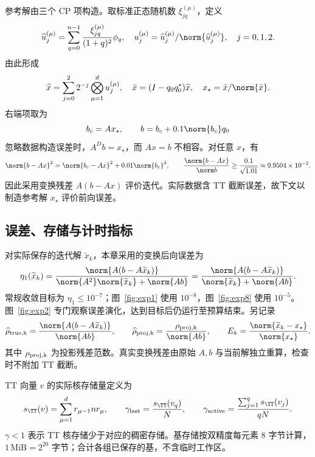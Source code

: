 参考解由三个 CP 项构造。取标准正态随机数 $\xi_{jq}^{(\mu)}$，定义
\[
 \widehat u_j^{(\mu)}=\sum_{q=0}^{n-1}\frac{\xi_{jq}^{(\mu)}}{(1+q)^2}\phi_q,
 \quad u_j^{(\mu)}=\widehat u_j^{(\mu)}/\norm{\widehat u_j^{(\mu)}},\quad j=0,1,2.
\]
由此形成
\begin{equation}\label{eq:exp-reference}
 \widehat x=\sum_{j=0}^2 2^{-j}\bigotimes_{\mu=1}^d u_j^{(\mu)},\quad
 \bar x=(I-q_0q_0^*)\widehat x,\quad x_\star=\bar x/\norm{\bar x}.
\end{equation}
右端项取为
\begin{equation}\label{eq:exp-rhs}
 b_c=Ax_\star,\qquad b=b_c+0.1\norm{b_c}q_0
\end{equation}
忽略数据构造误差时，$A^Db=x_\star$，而 $Ax=b$ 不相容。对任意 $x$，有
\[
 \norm{b-Ax}^2
 =\norm{b_c-Ax}^2+0.01\norm{b_c}^2,
 \qquad
 \frac{\norm{b-Ax}}{\norm b}\ge\frac{0.1}{\sqrt{1.01}}
 \approx9.9504\times10^{-2}.
\]
因此采用变换残差 $A(b-Ax)$ 评价迭代。实际数据含 TT 截断误差，故下文以制造参考解 $x_\star$ 评价前向误差。

\subsection{误差、存储与计时指标}

对实际保存的迭代解 $\widetilde x_k$，本章采用的变换后向误差为
\begin{equation}\label{eq:exp-eta}
 \eta_1(\widetilde x_k)
 =\frac{\norm{A(b-A\widetilde x_k)}}
 {\norm{A^2}\norm{\widetilde x_k}+\norm{Ab}}
 =\frac{\norm{A(b-A\widetilde x_k)}}
 {\norm{\widetilde x_k}+\norm{Ab}}.
\end{equation}
常规收敛目标为 $\eta_1\le10^{-7}$；图~\ref{fig:exp1} 使用 $10^{-8}$，图~\ref{fig:exp8} 使用 $10^{-5}$。图~\ref{fig:exp2} 专门观察误差演化，达到目标后仍运行至预算结束。另记录
\begin{equation}\label{eq:exp-other-errors}
 \widehat\rho_{\rm true,k}
 =\frac{\norm{A(b-A\widetilde x_k)}}{\norm{Ab}},\qquad
 \widehat\rho_{\rm proj,k}=\frac{\rho_{\rm proj,k}}{\norm{Ab}},\qquad
 E_k=\frac{\norm{\widetilde x_k-x_\star}}{\norm{x_\star}}.
\end{equation}
其中 $\rho_{\rm proj,k}$ 为投影残差范数。真实变换残差由原始 $A,b$ 与当前解独立重算，检查时不附加 TT 截断。

TT 向量 $v$ 的实际核存储量定义为
\begin{equation}\label{eq:exp-storage}
 s_{\TT}(v)=\sum_{\mu=1}^d r_{\mu-1}nr_\mu,
 \qquad
 \gamma_{\rm last}=\frac{s_{\TT}(v_q)}N,\qquad
 \gamma_{\rm active}=\frac{\sum_{j=1}^q s_{\TT}(v_j)}{qN}.
\end{equation}
$\gamma<1$ 表示 TT 核存储少于对应的稠密存储。基存储按双精度每元素 $8$ 字节计算，$1\,\mathrm{MiB}=2^{20}$ 字节；合计各组已保存的基，不含临时工作区。

